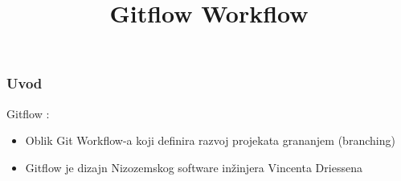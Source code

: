\documentclass[utf8]{beamer}
\title{Gitflow Workflow}
\begin{document}
\maketitle{}
\begin{frame}
\frametitle{Uvod}
Gitflow :
\begin{itemize}
\item Oblik Git Workflow-a koji definira razvoj projekata grananjem (branching)
\item Gitflow je dizajn Nizozemskog software inžinjera Vincenta Driessena
\end{itemize}
\end{frame}
\end{document}
